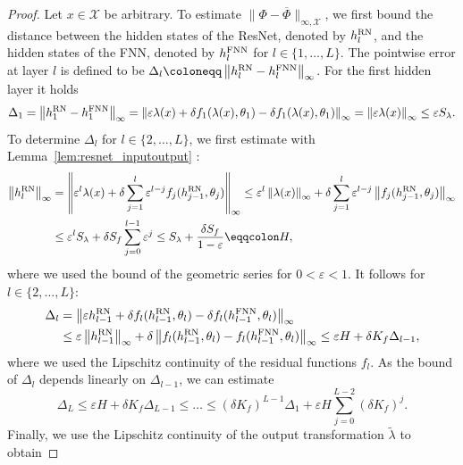 \documentclass[10pt]{article}
\theoremstyle{definition}
\numberwithin{equation}{section}
\newcommand{\eps}{\varepsilon}
\newcommand\norm[1]{\left\lVert#1\right\rVert}
\newcommand\normk[1]{\lVert#1\lVert}
\begin{document}
\begin{proof}
	Let $x\in \mathcal{X}$ be arbitrary. To estimate $\normk{\Phi-\overline{\Phi}}_{\infty,\mathcal{X}}$, we first bound the distance between the hidden states of the ResNet, denoted by $h_l^{\textup{RN}}$, and the hidden states of the FNN, denoted by $h_l^{\textup{FNN}}$ for $l \in \{1,\ldots,L\}$. The pointwise error at layer $l$ is defined to be $\Delta_l \coloneqq \norm{h_l^{\textup{RN}}-h_l^{\textup{FNN}}}_\infty$. 
    For the first hidden layer it holds 
    \begin{equation*}
        \Delta_1 = \norm{h_1^{\textup{RN}}-h_1^{\textup{FNN}}}_\infty = \norm{\eps \lambda(x) + \delta f_1(\lambda(x),\theta_1) -\delta f_1(\lambda(x),\theta_1)}_\infty = \norm{\eps \lambda(x)}_\infty \leq \eps S_\lambda.
    \end{equation*}
    To determine $\Delta_l$ for $l \in \{2, \ldots, L\}$, we first estimate with Lemma~\ref{lem:resnet_inputoutput} :
    \begin{align*}
        \norm{h_l^{\textup{RN}}}_\infty &= \norm{\eps^l \lambda(x) + \delta \sum_{j = 1}^{l} \eps^{l-j}f_j(h_{j-1}^{\textup{RN}},\theta_j)}_\infty \leq \eps^l \norm{\lambda(x)}_\infty + \delta \sum_{j=1}^{l} \eps^{l-j} \norm{f_j(h_{j-1}^{\textup{RN}},\theta_j)}_\infty \\
        &\leq \eps^l S_\lambda  + \delta S_f  \sum_{j=0}^{l-1} \eps^j 
        \leq S_\lambda  + \frac{\delta S_f}{1-\eps} \eqqcolon H,
    \end{align*}
    where we used the bound of the geometric series for $0 < \eps < 1$. It follows for $l \in \{2,\ldots,L\}$:
    \begin{align*}
        \Delta_l &= \norm{\eps h_{l-1}^{\textup{RN}} + \delta f_l(h_{l-1}^{\textup{RN}}, \theta_l) - \delta f_l(h_{l-1}^{\textup{FNN}}, \theta_l)}_\infty \\
        &\leq \eps \norm{h_{l-1}^{\textup{RN}}}_\infty + \delta \norm{f_l(h_{l-1}^{\textup{RN}}, \theta_l) - f_l(h_{l-1}^{\textup{FNN}}, \theta_l)}_\infty \leq \eps H + \delta K_f \Delta_{l-1},
    \end{align*}
    where we used the Lipschitz continuity of the residual functions $f_l$. As the bound of $\Delta_l$ depends linearly on $\Delta_{l-1}$, we can estimate
    \begin{equation*}
        \Delta_L \leq \eps H + \delta K_f \Delta_{L-1} \leq \ldots \leq (\delta K_f)^{L-1}\Delta_1 + \eps H \sum_{j = 0}^{L-2} (\delta K_f)^j.
    \end{equation*}
    Finally, we use the Lipschitz continuity of the output transformation $\tilde{\lambda}$ to obtain

\end{proof}
\end{document}
